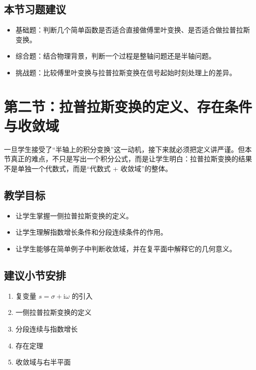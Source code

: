 \subsection*{本节习题建议}
\begin{itemize}
    \item 基础题：判断几个简单函数是否适合直接做傅里叶变换、是否适合做拉普拉斯变换。
    \item 综合题：结合物理背景，判断一个过程是整轴问题还是半轴问题。
    \item 挑战题：比较傅里叶变换与拉普拉斯变换在信号起始时刻处理上的差异。
\end{itemize}

\section{第二节：拉普拉斯变换的定义、存在条件与收敛域}

\begin{wulibj}[本节要解决的问题]
一旦学生接受了``半轴上的积分变换''这一动机，接下来就必须把定义讲严谨。但本节真正的难点，不只是写出一个积分公式，而是让学生明白：拉普拉斯变换的结果不是单独一个代数式，而是``代数式 + 收敛域''的整体。
\end{wulibj}

\subsection*{教学目标}
\begin{itemize}
    \item 让学生掌握一侧拉普拉斯变换的定义。
    \item 让学生理解指数增长条件和分段连续条件的作用。
    \item 让学生能够在简单例子中判断收敛域，并在复平面中解释它的几何意义。
\end{itemize}

\subsection*{建议小节安排}
\begin{enumerate}
    \item 复变量 $s=\sigma+\mathrm{i}\omega$ 的引入
    \item 一侧拉普拉斯变换的定义
    \item 分段连续与指数增长
    \item 存在定理
    \item 收敛域与右半平面
\end{enumerate}

